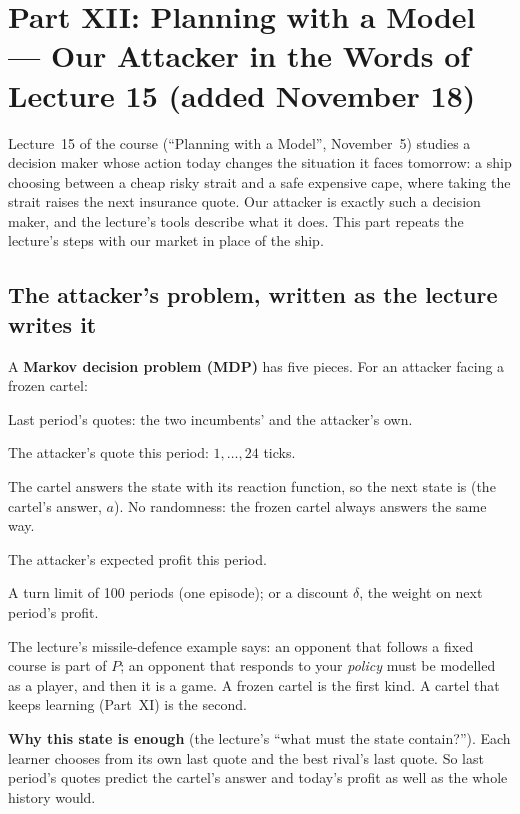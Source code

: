 \documentclass[11pt]{article}
\begin{document}
\section{Part XII: Planning with a Model --- Our Attacker in the Words of Lecture 15 (added November 18)}\label{sec:planning}
Lecture~15 of the course (``Planning with a Model'', November~5) studies a decision maker whose
action today changes the situation it faces tomorrow: a ship choosing between a cheap risky strait and a
safe expensive cape, where taking the strait raises the next insurance quote. Our attacker is exactly
such a decision maker, and the lecture's tools describe what it does. This part repeats the lecture's
steps with our market in place of the ship.

\subsection{The attacker's problem, written as the lecture writes it}
A \textbf{Markov decision problem (MDP)} has five pieces. For an attacker facing a frozen cartel:
\begin{description}[style=sameline,leftmargin=0pt,itemsep=3pt]
\item[State $x$] Last period's quotes: the two incumbents' and the attacker's own.
\item[Action $a$] The attacker's quote this period: $1,\dots,24$ ticks.
\item[Transitions $P$] The cartel answers the state with its reaction function, so the next state is
(the cartel's answer, $a$). No randomness: the frozen cartel always answers the same way.
\item[Reward $r(x,a)$] The attacker's expected profit this period.
\item[Horizon] A turn limit of 100 periods (one episode); or a discount $\delta$, the weight on
next period's profit.
\end{description}
\begin{intuition}
The lecture's missile-defence example says: an opponent that follows a fixed course is part of $P$; an
opponent that responds to your \emph{policy} must be modelled as a player, and then it is a game. A
frozen cartel is the first kind. A cartel that keeps learning (Part~XI) is the second.
\end{intuition}
\textbf{Why this state is enough} (the lecture's ``what must the state contain?''). Each learner chooses
from its own last quote and the best rival's last quote. So last period's quotes predict the cartel's
answer and today's profit as well as the whole history would.
\end{document}
